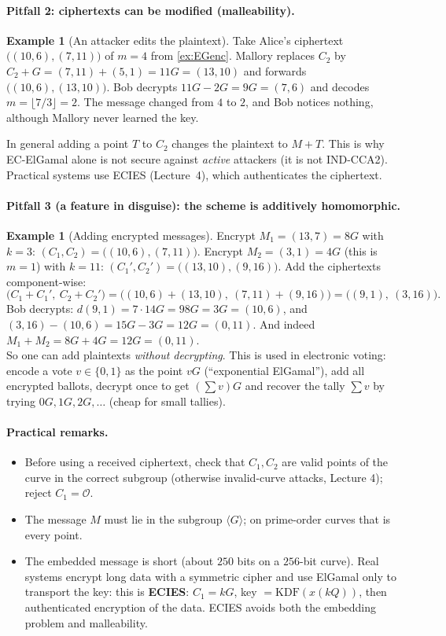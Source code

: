 \documentclass[11pt,a4paper,oneside]{book}
\theoremstyle{plain}
\theoremstyle{definition}
\newtheorem{example}[theorem]{Example}
\theoremstyle{remark}
\newcommand{\Oinf}{\mathcal{O}}
\begin{document}
\paragraph{Pitfall 2: ciphertexts can be modified (malleability).}
\begin{example}[An attacker edits the plaintext]
Take Alice's ciphertext $\big((10,6),(7,11)\big)$ of $m=4$ from \cref{ex:EGenc}. Mallory replaces $C_2$ by $C_2+G=(7,11)+(5,1)=11G=(13,10)$ and forwards $\big((10,6),(13,10)\big)$. Bob decrypts $11G-2G=9G=(7,6)$ and decodes $m=\lfloor7/3\rfloor=2$. The message changed from $4$ to $2$, and Bob notices nothing, although Mallory never learned the key.
\end{example}
In general adding a point $T$ to $C_2$ changes the plaintext to $M+T$. This is why EC-ElGamal alone is not secure against \emph{active} attackers (it is not IND-CCA2). Practical systems use ECIES (Lecture~4), which authenticates the ciphertext.

\paragraph{Pitfall 3 (a feature in disguise): the scheme is additively homomorphic.}
\begin{example}[Adding encrypted messages]
Encrypt $M_1=(13,7)=8G$ with $k=3$: $(C_1,C_2)=\big((10,6),(7,11)\big)$. Encrypt $M_2=(3,1)=4G$ (this is $m=1$) with $k=11$: $(C_1',C_2')=\big((13,10),(9,16)\big)$. Add the ciphertexts component-wise:
\[
\big(C_1+C_1',\ C_2+C_2'\big)=\big((10,6)+(13,10),\ (7,11)+(9,16)\big)=\big((9,1),\ (3,16)\big).
\]
Bob decrypts: $d(9,1)=7\cdot14G=98G=3G=(10,6)$, and $(3,16)-(10,6)=15G-3G=12G=(0,11)$. And indeed $M_1+M_2=8G+4G=12G=(0,11)$. \checkmark\\
So one can add plaintexts \emph{without decrypting}. This is used in electronic voting: encode a vote $v\in\{0,1\}$ as the point $vG$ (``exponential ElGamal''), add all encrypted ballots, decrypt once to get $(\sum v)G$ and recover the tally $\sum v$ by trying $0G,1G,2G,\dots$ (cheap for small tallies).
\end{example}

\paragraph{Practical remarks.}
\begin{itemize}[nosep]
\item Before using a received ciphertext, check that $C_1,C_2$ are valid points of the curve in the correct subgroup (otherwise invalid-curve attacks, Lecture 4); reject $C_1=\Oinf$.
\item The message $M$ must lie in the subgroup $\langle G\rangle$; on prime-order curves that is every point.
\item The embedded message is short (about $250$ bits on a $256$-bit curve). Real systems encrypt long data with a symmetric cipher and use ElGamal only to transport the key: this is \textbf{ECIES}: $C_1=kG$, key $=\mathrm{KDF}(x(kQ))$, then authenticated encryption of the data. ECIES avoids both the embedding problem and malleability.
\end{itemize}
\end{document}

